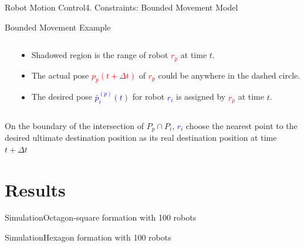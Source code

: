 \documentclass[10pt]{beamer}
\begin{document}
\begin{frame}{Robot Motion Control}{4. Constraints: Bounded Movement Model}
\begin{block}{Bounded Movement Example}
\begin{columns}[T]
\begin{column}{.5\textwidth}
      \end{column}%
      \begin{column}{.45\textwidth}
        \begin{itemize}
        \item Shadowed region is the range of robot
          \textcolor{red}{$r_p$} at time $t$.
        \item The actual pose \textcolor{red}{$p_p(t+\Delta{t})$} of
          \textcolor{red}{$r_p$} could be anywhere in the dashed
          circle.
        \item The desired pose \textcolor{blue}{$\bar{p}_i^{(p)}(t)$}
          for robot \textcolor{blue}{$r_i$} is assigned by
          \textcolor{red}{$r_p$} at time $t$.
        \end{itemize}         
      \end{column}%
    \end{columns}
    On the boundary of the intersection of $P_p \cap P_i$,
    \textcolor{blue}{$r_i$} choose the nearest point to the desired
    ultimate destination position as its real destination position at
    time $t+\Delta{t}$
  \end{block}
\end{frame}


\section{Results}
\begin{frame}{Simulation}{Octagon-square formation with 100 robots}
  \begin{center}
  \end{center}
\end{frame}
\begin{frame}{Simulation}{Hexagon formation with 100 robots}
  \begin{center}
  \end{center}
\end{frame}
\end{document}
